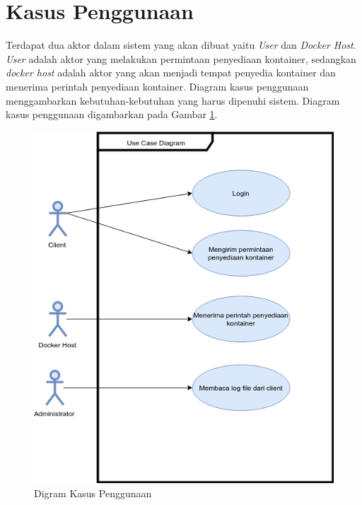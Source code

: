   \section{Kasus Penggunaan}
  Terdapat dua aktor dalam sistem yang akan dibuat yaitu \textit{User} dan \textit{Docker Host}. \textit{User} adalah aktor yang melakukan permintaan penyediaan kontainer, sedangkan \textit{docker host} adalah aktor yang akan menjadi tempat penyedia kontainer dan menerima perintah penyediaan kontainer. Diagram kasus penggunaan menggambarkan kebutuhan-kebutuhan yang harus dipenuhi sistem. Diagram kasus penggunaan digambarkan pada Gambar \ref{gambarDiagramKasusPenggunaan}.
  \begin{figure}[!h] %
  \centering
  \includegraphics[width=\linewidth]{images/bab3/usecase}
  \caption{Digram Kasus Penggunaan}
  \label{gambarDiagramKasusPenggunaan}
  \end{figure}
  \\
		    		    
